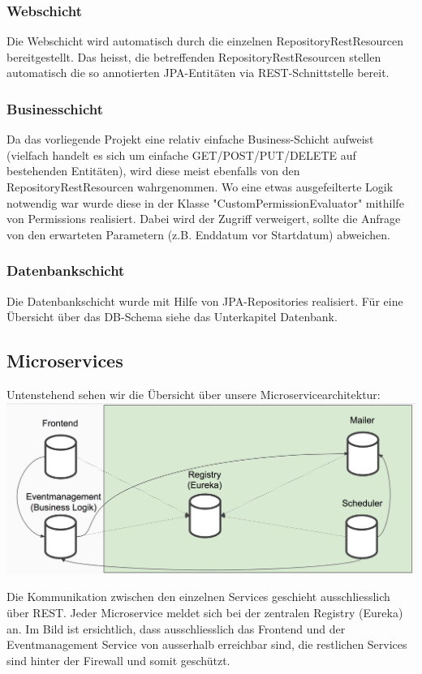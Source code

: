 \documentclass[11pt]{article} %
\begin{document}
\subsubsection{Webschicht}
Die Webschicht wird automatisch durch die einzelnen RepositoryRestResourcen bereitgestellt. Das heisst, die betreffenden RepositoryRestResourcen stellen automatisch die so annotierten JPA-Entitäten via REST-Schnittstelle bereit.

\subsubsection{Businesschicht}
Da das vorliegende Projekt eine relativ einfache Business-Schicht aufweist (vielfach handelt es sich um einfache GET/POST/PUT/DELETE auf bestehenden Entitäten), wird diese meist ebenfalls von den RepositoryRestResourcen wahrgenommen.
Wo eine etwas ausgefeilterte Logik notwendig war wurde diese in der Klasse "CustomPermissionEvaluator" mithilfe von Permissions realisiert. Dabei wird der Zugriff verweigert, sollte die Anfrage von den erwarteten Parametern (z.B. Enddatum vor Startdatum) abweichen.

\subsubsection{Datenbankschicht}
Die Datenbankschicht wurde mit Hilfe von JPA-Repositories realisiert. Für eine Übersicht über das DB-Schema siehe das Unterkapitel Datenbank.

\subsection{Microservices}

Untenstehend sehen wir die Übersicht über unsere Microservicearchitektur:
\includegraphics[width=1\textwidth]{microservices}

Die Kommunikation zwischen den einzelnen Services geschieht ausschliesslich über REST. Jeder Microservice meldet sich bei der zentralen Registry (Eureka) an. Im Bild ist ersichtlich, dass ausschliesslich das Frontend und der Eventmanagement Service von ausserhalb erreichbar sind, die restlichen Services sind hinter der Firewall und somit geschützt.
\end{document}
